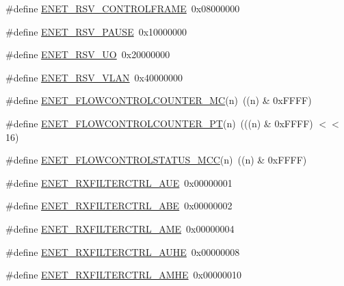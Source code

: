 \begin{DoxyCompactItemize}
\item 
\#define \hyperlink{group___e_n_e_t__17_x_x__40_x_x_ga4ad18351df747e65f1b3fff139c8d552}{E\+N\+E\+T\+\_\+\+R\+S\+V\+\_\+\+C\+O\+N\+T\+R\+O\+L\+F\+R\+A\+M\+E}~0x08000000
\item 
\#define \hyperlink{group___e_n_e_t__17_x_x__40_x_x_ga7ad487168e3201b01eab8504e623d79b}{E\+N\+E\+T\+\_\+\+R\+S\+V\+\_\+\+P\+A\+U\+S\+E}~0x10000000
\item 
\#define \hyperlink{group___e_n_e_t__17_x_x__40_x_x_gae2f33f7ad025f84d58c97ccb9fecf89a}{E\+N\+E\+T\+\_\+\+R\+S\+V\+\_\+\+U\+O}~0x20000000
\item 
\#define \hyperlink{group___e_n_e_t__17_x_x__40_x_x_gabe88542e8c0a6fb6ea649cba94d2028d}{E\+N\+E\+T\+\_\+\+R\+S\+V\+\_\+\+V\+L\+A\+N}~0x40000000
\item 
\#define \hyperlink{group___e_n_e_t__17_x_x__40_x_x_ga6792fccacadbec16632406f00afbb202}{E\+N\+E\+T\+\_\+\+F\+L\+O\+W\+C\+O\+N\+T\+R\+O\+L\+C\+O\+U\+N\+T\+E\+R\+\_\+\+M\+C}(n)~((n) \& 0x\+F\+F\+F\+F)
\item 
\#define \hyperlink{group___e_n_e_t__17_x_x__40_x_x_ga08d75c6c9a79476c9473d49efea2eb4b}{E\+N\+E\+T\+\_\+\+F\+L\+O\+W\+C\+O\+N\+T\+R\+O\+L\+C\+O\+U\+N\+T\+E\+R\+\_\+\+P\+T}(n)~(((n) \& 0x\+F\+F\+F\+F) $<$$<$ 16)
\item 
\#define \hyperlink{group___e_n_e_t__17_x_x__40_x_x_gaa8ef1915c4211c216269ae6f5c7bad26}{E\+N\+E\+T\+\_\+\+F\+L\+O\+W\+C\+O\+N\+T\+R\+O\+L\+S\+T\+A\+T\+U\+S\+\_\+\+M\+C\+C}(n)~((n) \& 0x\+F\+F\+F\+F)
\item 
\#define \hyperlink{group___e_n_e_t__17_x_x__40_x_x_ga61d70abfbcb89e08b14d7aa571520db3}{E\+N\+E\+T\+\_\+\+R\+X\+F\+I\+L\+T\+E\+R\+C\+T\+R\+L\+\_\+\+A\+U\+E}~0x00000001
\item 
\#define \hyperlink{group___e_n_e_t__17_x_x__40_x_x_gaa63bf71c0439dc5176b4af167f4c7f75}{E\+N\+E\+T\+\_\+\+R\+X\+F\+I\+L\+T\+E\+R\+C\+T\+R\+L\+\_\+\+A\+B\+E}~0x00000002
\item 
\#define \hyperlink{group___e_n_e_t__17_x_x__40_x_x_ga868a51913649ab45dce2ed495d09e401}{E\+N\+E\+T\+\_\+\+R\+X\+F\+I\+L\+T\+E\+R\+C\+T\+R\+L\+\_\+\+A\+M\+E}~0x00000004
\item 
\#define \hyperlink{group___e_n_e_t__17_x_x__40_x_x_ga14e7ab247ade314679d3546278102373}{E\+N\+E\+T\+\_\+\+R\+X\+F\+I\+L\+T\+E\+R\+C\+T\+R\+L\+\_\+\+A\+U\+H\+E}~0x00000008
\item 
\#define \hyperlink{group___e_n_e_t__17_x_x__40_x_x_ga9d6abb88eb71199e6b8206c71ecc1148}{E\+N\+E\+T\+\_\+\+R\+X\+F\+I\+L\+T\+E\+R\+C\+T\+R\+L\+\_\+\+A\+M\+H\+E}~0x00000010
$$
\end{DoxyCompactItemize}
